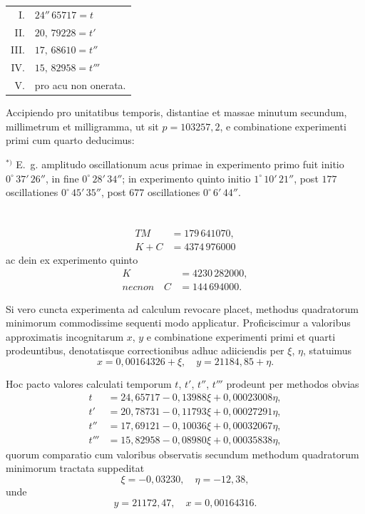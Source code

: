\documentclass[fontsize=11pt,paper=a4,twoside,openany]{scrbook}
\begin{document}
\begin{center}
\begin{tabular}{r@{~}l}
I. & $24''\,65717 = t$ \\
II. & $20,\,79228 = t'$ \\
III. & $17,\,68610 = t''$ \\
IV. & $15,\,82958 = t'''$ \\
V. & pro acu non onerata.
\end{tabular}
\end{center}

Accipiendo pro unitatibus temporis, distantiae et massae minutum secundum, millimetrum et milligramma, ut sit $p=103257{,}2$, e combinatione experimenti primi cum quarto deducimus:

$^{*)}$ E.~g. amplitudo oscillationum acus primae in experimento primo fuit initio $0^\circ\,37'\,26''$, in fine $0^\circ\,28'\,34''$; in experimento quinto initio $1^\circ\,10'\,21''$, post $177$ oscillationes $0^\circ\,45'\,35''$, post $677$ oscillationes $0^\circ\,6'\,44''$.

\section{}

\begin{align*}
TM &= 179\,641070,\\
K+C &= 4374\,976000
\end{align*}
ac dein ex experimento quinto
\begin{align*}
K &= 4230\,282000,\\
necnon\quad C &= 144\,694000.
\end{align*}

Si vero cuncta experimenta ad calculum revocare placet, methodus quadratorum minimorum commodissime sequenti modo applicatur. Proficiscimur a valoribus approximatis incognitarum $x$, $y$ e combinatione experimenti primi et quarti prodeuntibus, denotatisque correctionibus adhuc adiiciendis per $\xi$, $\eta$, statuimus
\[
x = 0{,}00164326 + \xi,\quad y = 21184{,}85 + \eta.
\]

Hoc pacto valores calculati temporum $t$, $t'$, $t''$, $t'''$ prodeunt per methodos obvias
\begin{align*}
t &= 24{,}65717 - 0{,}13988\xi + 0{,}00023008\eta,\\
t' &= 20{,}78731 - 0{,}11793\xi + 0{,}00027291\eta,\\
t'' &= 17{,}69121 - 0{,}10036\xi + 0{,}00032067\eta,\\
t''' &= 15{,}82958 - 0{,}08980\xi + 0{,}00035838\eta,
\end{align*}
quorum comparatio cum valoribus observatis secundum methodum quadratorum minimorum tractata suppeditat
\[
\xi = -0{,}03230,\quad \eta = -12{,}38,
\]
unde
\[
y = 21172{,}47,\quad x = 0{,}00164316.
\]
\end{document}
